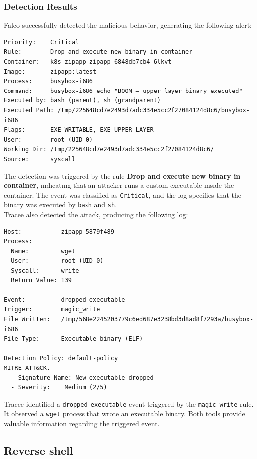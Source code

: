 \subsubsection{Detection Results}
Falco successfully detected the malicious behavior, generating the following alert:

\begin{verbatim}
Priority:    Critical
Rule:        Drop and execute new binary in container
Container:   k8s_zipapp_zipapp-6848db7cb4-6lkvt
Image:       zipapp:latest
Process:     busybox-i686
Command:     busybox-i686 echo "BOOM — upper layer binary executed"
Executed by: bash (parent), sh (grandparent)
Executed Path: /tmp/225648cd7e2493d7adc334e5cc2f27084124d8c6/busybox-i686
Flags:       EXE_WRITABLE, EXE_UPPER_LAYER
User:        root (UID 0)
Working Dir: /tmp/225648cd7e2493d7adc334e5cc2f27084124d8c6/
Source:      syscall
\end{verbatim}
The detection was triggered by the rule \textbf{Drop and execute new binary in container}, indicating that an attacker runs a custom executable inside the container. The event was classified as \texttt{Critical}, and the log specifies that the binary was executed by \texttt{bash} and \texttt{sh}.\\
Tracee also detected the attack, producing the following log:
\begin{verbatim}
Host:           zipapp-5879f489
Process:
  Name:         wget
  User:         root (UID 0)
  Syscall:      write
  Return Value: 139

Event:          dropped_executable
Trigger:        magic_write
File Written:   /tmp/568e2245203779c6ed687e3238bd3d8ad8f7293a/busybox-i686
File Type:      Executable binary (ELF)

Detection Policy: default-policy
MITRE ATT&CK:
  - Signature Name: New executable dropped
  - Severity:    Medium (2/5)
\end{verbatim}
Tracee identified a \texttt{dropped\_executable} event triggered by the \texttt{magic\_write} rule. It observed a \texttt{wget} process that wrote an executable binary. 
Both tools provide valuable information regarding the triggered event. 


\subsection{Reverse shell}

